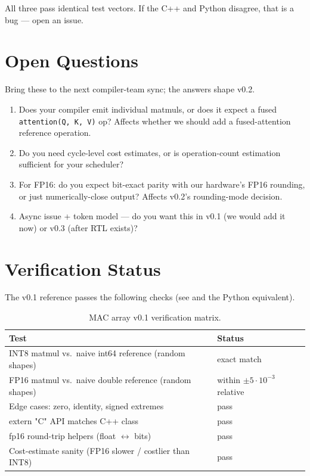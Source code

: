 \documentclass[11pt]{article}
\begin{document}
All three pass identical test vectors. If the C++ and Python disagree,
that is a bug --- open an issue.

\section{Open Questions}
\label{sec:open}

Bring these to the next compiler-team sync; the answers shape v0.2.

\begin{enumerate}
\item Does your compiler emit individual matmuls, or does it expect a
      fused \texttt{attention(Q, K, V)} op? Affects whether we should
      add a fused-attention reference operation.
\item Do you need cycle-level cost estimates, or is operation-count
      estimation sufficient for your scheduler?
\item For FP16: do you expect bit-exact parity with our hardware's
      FP16 rounding, or just numerically-close output? Affects v0.2's
      rounding-mode decision.
\item Async issue + token model --- do you want this in v0.1 (we
      would add it now) or v0.3 (after RTL exists)?
\end{enumerate}

\section{Verification Status}
\label{sec:verif}

The v0.1 reference passes the following checks
(see  and the Python
equivalent).

\begin{table}[ht]
\centering
\small
\caption{MAC array v0.1 verification matrix.}
\label{tab:verif}
\begin{tabular}{@{}l l@{}}
\toprule
Test                                            & Status \\
\midrule
INT8 matmul vs.\ naive int64 reference (random shapes) & exact match \\
FP16 matmul vs.\ naive double reference (random shapes) & within $\pm 5 \cdot 10^{-3}$ relative \\
Edge cases: zero, identity, signed extremes      & pass \\
extern "C" API matches C++ class                 & pass \\
fp16 round-trip helpers (float $\leftrightarrow$ bits) & pass \\
Cost-estimate sanity (FP16 slower / costlier than INT8) & pass \\
\bottomrule
\end{tabular}
\end{table}
\end{document}

